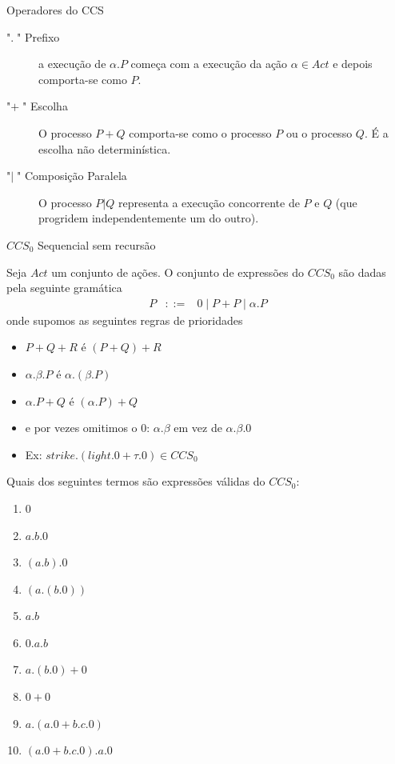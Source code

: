 \documentclass[aspectratio=169]{beamer}
\begin{document}
\begin{frame}{Operadores do CCS}
\begin{description}
\item["$.\;$" Prefixo ] a execução de $\alpha.P$ começa com a execução da ação $\alpha\in Act$ e depois comporta-se como $P$.	
\item["$+\;$" Escolha ] O processo $P+Q$ comporta-se como o processo $P$ ou o processo $Q$. É a escolha não determinística.
\item["$|\;$"  Composição Paralela ]
O processo $P| Q$ representa a execução concorrente de $P$ e $Q$ (que progridem independentemente um do outro). 
\end{description}
\end{frame}
\begin{frame}{$CCS_0$ Sequencial sem recursão}
	
Seja $Act$ um conjunto de ações. O conjunto de expressões do $CCS_0$ são dadas pela seguinte gramática
\begin{eqnarray*}
P&::=& 0 \mid P+P \mid \alpha.P
\end{eqnarray*}
onde supomos as seguintes regras de prioridades
\begin{itemize}[<+->]
	\item $P+Q+R$ é $(P+Q)+R$
\item $\alpha.\beta.P$ é $\alpha.(\beta.P)$
\item  $\alpha.P+ Q$ é $(\alpha.P) + Q$
\item e por vezes omitimos o $0$: $\alpha.\beta$ em vez de $\alpha.\beta.0$ 
\item Ex:  $strike.(light.0 + \tau.0) \in CCS_0$
\end{itemize}
\end{frame}

\begin{frame}
	\begin{exem}
	 Quais dos seguintes termos são expressões válidas do $CCS_0$:
	 \begin{enumerate}
	 	\item $0$
	 	\item $a.b.0$\label{ex:2}
	 	\item $(a.b).0$ \label{ex:3}
	 	\item $(a.(b.0))$
		\item $a.b$ \label{ex:4}
		\item  $0.a.b$ \label{ex:6}
		\item $a.(b.0)+0$
		\item $0+0$
		\item $a.(a.0+b.c.0)$
		\item $(a.0+b.c.0).a.0$ \label{ex:9}
	 \end{enumerate}	
	\end{exem}
\end{frame}
\end{document}
